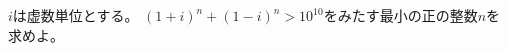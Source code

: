 \documentclass[../../main.tex]{subfiles}
\begin{document}
$i$は虚数単位とする。
${(1+i)}^n+{(1-i)}^n>{10}^{10}$をみたす最小の正の整数$n$を求めよ。
\end{document}
